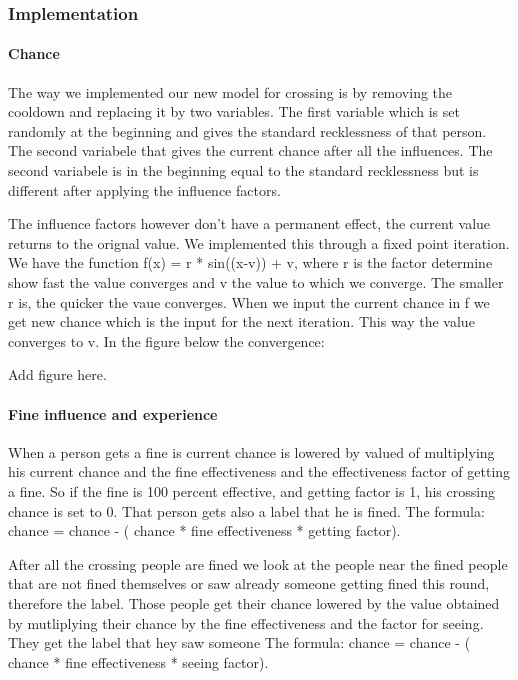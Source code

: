\documentclass[a4paper]{article}
\begin{document}
\subsubsection{Implementation}
\paragraph{Chance}
The way we implemented our new model for crossing is by removing the cooldown and replacing it by two variables. The first variable which is set randomly at the beginning and gives the standard recklessness of that person. The second variabele that gives the current chance after all the influences. The second variabele is in the beginning equal to the standard recklessness but is different after applying the influence factors.

The influence factors however don't have a permanent effect, the current value returns to the orignal value. We implemented this through a fixed point iteration. We have the function f(x) = r * sin((x-v)) + v, where r is the factor determine show fast the value converges and v the value to which we converge. The smaller r is, the quicker the vaue converges. When we input the current chance in f we get new chance which is the input for the next iteration. This way the value converges to v. In the figure below the convergence:

Add figure here.

\paragraph{Fine influence and experience}
When a person gets a fine is current chance is lowered by valued of multiplying his current chance and the fine effectiveness and the effectiveness factor of getting a fine. So if the fine is 100 percent effective, and getting factor is 1, his crossing chance is set to 0. That person gets also a label that he is fined.  The formula: chance = chance - ( chance * fine effectiveness * getting factor).

After all the crossing people are fined we look at the people near the fined people that are not fined themselves or saw already someone getting fined this round, therefore the label. Those people get their chance lowered by the value obtained by mutliplying their chance by the fine effectiveness and the factor for seeing. They get the label that hey saw someone The formula: chance = chance - ( chance * fine effectiveness * seeing factor).
\end{document}
